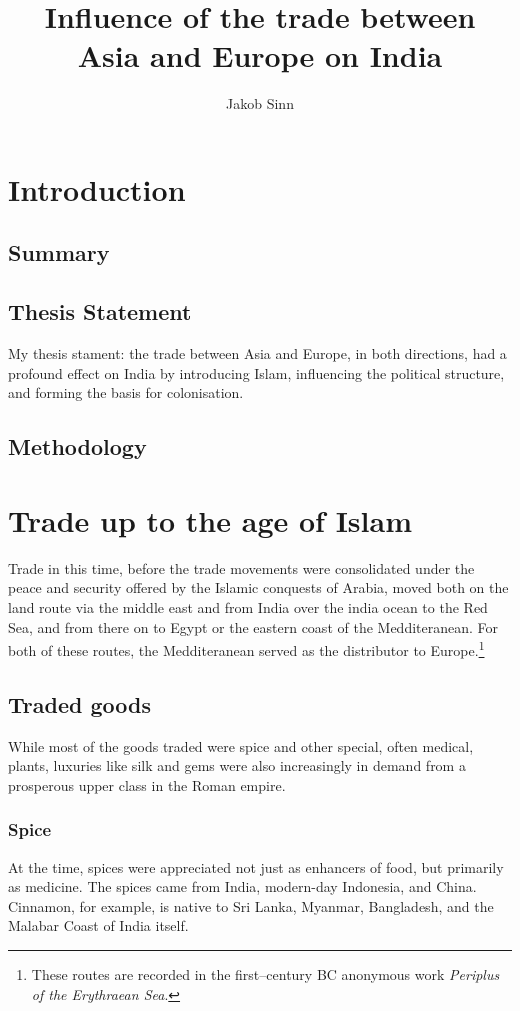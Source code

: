 \documentclass[11pt, a4paper]{scrreprt}
\begin{document}
\renewcommand{\baselinestretch}{1.5}
\subject{Facharbeit}
\author{Jakob Sinn}
\title{Influence of the trade between \\ Asia and Europe on India}
\maketitle
\tableofcontents
{}
\chapter{Introduction}
\section{Summary}

\section{Thesis Statement}
My thesis stament: the trade between Asia and Europe, in both directions, had a profound effect on India by introducing Islam, influencing the political structure, and forming the basis for colonisation.
\section{Methodology}
 
\chapter{Trade up to the age of Islam}
Trade in this time, before the trade movements were consolidated under the peace and security offered by the Islamic conquests of Arabia, moved both on the land route via the middle east and from India over the india ocean to the Red Sea, and from there on to Egypt or the eastern coast of the Medditeranean.\autocite[Chapter 7]{Rome} For both of these routes, the Medditeranean served as the distributor to Europe.\footnote{These routes are recorded in the first--century BC anonymous work \emph{Periplus of the Erythraean Sea}.}

\section{Traded goods}
While most of the goods traded were spice and other special, often medical, plants, luxuries like silk and gems were also increasingly in demand from a prosperous upper class in the Roman empire.\autocite{RIS}
\subsection{Spice}
At the time, spices were appreciated not just as enhancers of food, but primarily as medicine\autocite{MST}. The spices came from India, modern-day Indonesia, and China. Cinnamon, for example, is native to Sri Lanka, Myanmar, Bangladesh, and the Malabar Coast of India itself\autocite{Cinnamon}.
\end{document}
